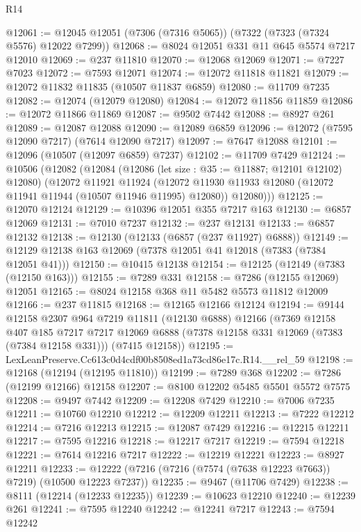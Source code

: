 \begin{lexlean}{R14}
\begin{coremodule}
@12061 := @12045 @12051 (@7306 (@7316 @5065)) (@7322 (@7323 (@7324 @5576) @12022 @7299))
@12068 := @8024 @12051 @331 @11 @645 @5574 @7217 @12010
@12069 := @237 @11810
@12070 := @12068 @12069
@12071 := @7227 @7023
@12072 := @7593 @12071
@12074 := @12072 @11818 @11821
@12079 := @12072 @11832 @11835 (@10507 @11837 @6859)
@12080 := @11709 @7235
@12082 := @12074 (@12079 @12080)
@12084 := @12072 @11856 @11859
@12086 := @12072 @11866 @11869
@12087 := @9502 @7442
@12088 := @8927 @261
@12089 := @12087 @12088
@12090 := @12089 @6859
@12096 := @12072 (@7595 @12090 @7217) (@7614 @12090 @7217)
@12097 := @7647 @12088
@12101 := @12096 (@10507 (@12097 @6859) @7237)
@12102 := @11709 @7429
@12124 := @10506
    (@12082
      (@12084
        (@12086 (let size : @35 := @11887; @12101 @12102) @12080)
        (@12072
          @11921
          @11924
          (@12072 @11930 @11933 @12080 (@12072 @11941 @11944 (@10507 @11946 @11995) @12080))
          @12080)))
@12125 := @12070 @12124
@12129 := @10396 @12051 @355 @7217 @163
@12130 := @6857 @12069
@12131 := @7010 @7237
@12132 := @237 @12131
@12133 := @6857 @12132
@12138 := @12130 (@12133 (@6857 (@237 @11927) @6888))
@12149 := @12129 @12138 @163 @12069 (@7378 @12051 @41 @12018 (@7383 (@7384 @12051 @41)))
@12150 := @10415 @12138
@12154 := @12125 (@12149 (@7383 (@12150 @163)))
@12155 := @7289 @331
@12158 := @7286 (@12155 @12069) @12051
@12165 := @8024 @12158 @368 @11 @5482 @5573 @11812 @12009
@12166 := @237 @11815
@12168 := @12165 @12166 @12124
@12194 := @9144
    @12158
    @2307
    @964
    @7219
    @11811
    (@12130 @6888)
    @12166
    (@7369
      @12158
      @407
      @185
      @7217
      @7217
      @12069
      @6888
      (@7378 @12158 @331 @12069 (@7383 (@7384 @12158 @331)))
      (@7415 @12158))
@12195 := LexLeanPreserve.Cc613c0d4cdf00b8508ed1a73cd86e17c.R14.__rel_59
@12198 := @12168 (@12194 (@12195 @11810))
@12199 := @7289 @368
@12202 := @7286 (@12199 @12166) @12158
@12207 := @8100 @12202 @5485 @5501 @5572 @7575
@12208 := @9497 @7442
@12209 := @12208 @7429
@12210 := @7006 @7235
@12211 := @10760 @12210
@12212 := @12209 @12211
@12213 := @7222 @12212
@12214 := @7216 @12213
@12215 := @12087 @7429
@12216 := @12215 @12211
@12217 := @7595 @12216
@12218 := @12217 @7217
@12219 := @7594 @12218
@12221 := @7614 @12216 @7217
@12222 := @12219 @12221
@12223 := @8927 @12211
@12233 := @12222 (@7216 (@7216 (@7574 (@7638 @12223 @7663)) @7219) (@10500 @12223 @7237))
@12235 := @9467 (@11706 @7429)
@12238 := @8111 (@12214 (@12233 @12235))
@12239 := @10623 @12210
@12240 := @12239 @261
@12241 := @7595 @12240
@12242 := @12241 @7217
@12243 := @7594 @12242

\end{coremodule}
\end{lexlean}
